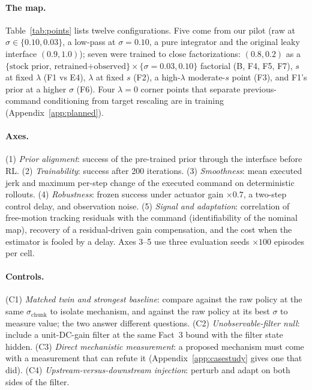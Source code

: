 \documentclass{article}
\newcommand{\schunk}{\sigma_{\mathrm{chunk}}}
\begin{document}
\paragraph{The map.} Table~\ref{tab:points} lists twelve configurations. Five come from our pilot (raw at $\sigma\in\{0.10,0.03\}$, a low-pass at $\sigma=0.10$, a pure integrator and the original leaky interface $(0.9,1.0)$); seven were trained to close factorizations: $(0.8,0.2)$ as a $\{\text{stock prior, retrained+observed}\}\times\{\sigma=0.03,0.10\}$ factorial (B, F4, F5, F7), $s$ at fixed $\lambda$ (F1 vs E4), $\lambda$ at fixed $s$ (F2), a high-$\lambda$ moderate-$s$ point (F3), and F1's prior at a higher $\sigma$ (F6). Four $\lambda=0$ corner points that separate previous-command conditioning from target rescaling are in training (Appendix~\ref{app:planned}).

\paragraph{Axes.} (1) \emph{Prior alignment}: success of the pre-trained prior through the interface before RL. (2) \emph{Trainability}: success after 200 iterations. (3) \emph{Smoothness}: mean executed jerk and maximum per-step change of the executed command on deterministic rollouts. (4) \emph{Robustness}: frozen success under actuator gain $\times0.7$, a two-step control delay, and observation noise. (5) \emph{Signal and adaptation}: correlation of free-motion tracking residuals with the command (identifiability of the nominal map), recovery of a residual-driven gain compensation, and the cost when the estimator is fooled by a delay. Axes 3--5 use three evaluation seeds $\times100$ episodes per cell.

\paragraph{Controls.} (C1) \emph{Matched twin and strongest baseline}: compare against the raw policy at the same $\schunk$ to isolate mechanism, and against the raw policy at its best $\sigma$ to measure value; the two answer different questions. (C2) \emph{Unobservable-filter null}: include a unit-DC-gain filter at the same Fact~3 bound with the filter state hidden. (C3) \emph{Direct mechanistic measurement}: a proposed mechanism must come with a measurement that can refute it (Appendix~\ref{app:casestudy} gives one that did). (C4) \emph{Upstream-versus-downstream injection}: perturb and adapt on both sides of the filter.
\end{document}
